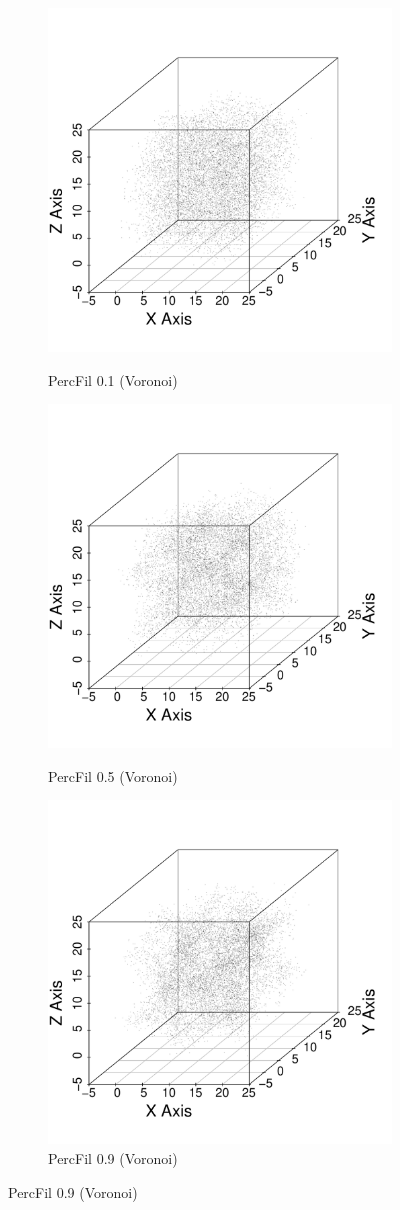 \documentclass[12pt]{article}
\begin{document}
\begin{center}
  \begin{figure}[htp!]
    \centering
    \begin{subfigure}{.32\textwidth}
      \centering
      \caption{PercFil 0.1 (Voronoi)}
      \includegraphics[width=0.6\linewidth]{figure_7_plot_pf_0_1.pdf}
      \label{fig:percfil01voronoi}
    \end{subfigure}
      \begin{subfigure}{.32\textwidth}
      \centering
      \caption{PercFil 0.5 (Voronoi)}
      \includegraphics[width=0.6\linewidth]{figure_7_plot_pf_0_5.pdf}
      \label{fig:percfil09voronoi}
    \end{subfigure}
      \begin{subfigure}{.32\textwidth}
      \centering
      \caption{PercFil 0.9 (Voronoi)}
      \includegraphics[width=0.6\linewidth]{figure_7_plot_pf_0_9.pdf}

\end{subfigure}
\end{figure}
\end{center}
\end{document}
